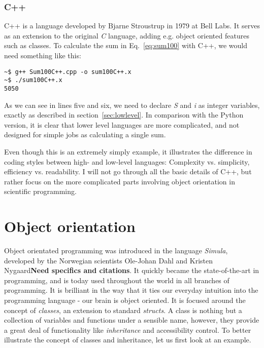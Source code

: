 \subsubsection{C++}

C++ is a language developed by Bjarne Stroustrup in 1979 at Bell Labs. It serves as an extension to the original \textit{C} language, adding e.g. object oriented features such as classes. To calculate the sum in Eq.~\ref{eq:sum100} with C++, we would need something like this:

\vspace{0.5 cm}


\begin{verbatim}
~$ g++ Sum100C++.cpp -o sum100C++.x
~$ ./sum100C++.x 
5050
\end{verbatim}


As we can see in lines five and six, we need to declare \textit{S} and \textit{i} as integer variables, exactly as described in section~\ref{sec:lowlevel}. In comparison with the Python version, it is clear that lower level languages are more complicated, and not designed for simple jobs as calculating a single sum.

Even though this is an extremely simply example, it illustrates the difference in coding styles between high- and low-level languages: Complexity vs. simplicity, efficiency vs. readability. I will not go through all the basic details of C++, but rather focus on the more complicated parts involving object orientation in scientific programming.


\section{Object orientation}
\label{sec:OO}

Object orientated programming was introduced in the language \textit{Simula}, developed by the Norwegian scientists Ole-Johan Dahl and Kristen Nygaard\textbf{Need specifics and citations}. It quickly became the state-of-the-art in programming, and is today used throughout the world in all branches of programming. It is brilliant in the way that it ties our everyday intuition into the programming language - our brain is object oriented. It is focused around the concept of \textit{classes}, an extension to standard \textit{structs}. A class is nothing but a collection of variables and functions under a sensible name, however, they provide a great deal of functionality like \textit{inheritance} and accessibility control. To better illustrate the concept of classes and inheritance, let us first look at an example.

